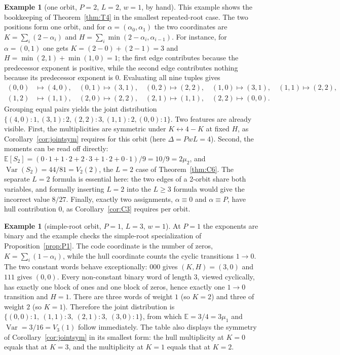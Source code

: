 \documentclass[11pt]{article}
\theoremstyle{definition}
\newtheorem{example}[theorem]{Example}
\theoremstyle{remark}
\newcommand{\E}{\mathbb{E}}
\begin{document}
\begin{example}[one orbit, \(P=2\), \(L=2\), \(w=1\), by hand]
\label{ex:E1}
This example shows the bookkeeping of Theorem~\ref{thm:T4} in the
smallest repeated-root case. The two positions form one orbit, and for
\(\alpha = (\alpha_0,\alpha_1)\) the two coordinates are
\(K = \sum_i (2-\alpha_i)\) and
\(H = \sum_i \min(2-\alpha_i, \alpha_{i-1})\). For instance, for
\(\alpha = (0,1)\) one gets \(K = (2-0) + (2-1) = 3\) and
\(H = \min(2,1) + \min(1,0) = 1\); the first edge contributes because
the predecessor exponent is positive, while the second edge contributes
nothing because its predecessor exponent is \(0\). Evaluating all nine
tuples gives
\[
\begin{aligned}
(0,0)&\mapsto(4,0),\quad (0,1)\mapsto(3,1),\quad (0,2)\mapsto(2,2),\quad
(1,0)\mapsto(3,1),\quad (1,1)\mapsto(2,2),\\
(1,2)&\mapsto(1,1),\quad (2,0)\mapsto(2,2),\quad (2,1)\mapsto(1,1),\quad (2,2)\mapsto(0,0).
\end{aligned}
\]
Grouping equal pairs yields the joint distribution
\(\{(4,0):1, (3,1):2, (2,2):3, (1,1):2, (0,0):1\}\). Two features are
already visible. First, the multiplicities are symmetric under
\(K \leftrightarrow 4-K\) at fixed \(H\), as
Corollary~\ref{cor:jointsym} requires for this orbit (here
\(\Delta = PwL = 4\)). Second, the moments can be read off directly:
\(\E[S_2] = (0\cdot1 + 1\cdot2 + 2\cdot3 + 1\cdot2 + 0\cdot1)/9 =
10/9 = 2\mu_2\), and
\(\operatorname{Var}(S_2) = 44/81 = V_2(2)\), the \(L=2\) case of
Theorem~\ref{thm:C6}. The separate \(L=2\) formula is essential here:
the two edges of a 2-orbit share both variables, and formally inserting
\(L=2\) into the \(L \ge 3\) formula would give the incorrect value
\(8/27\). Finally, exactly two assignments, \(\alpha \equiv 0\) and
\(\alpha \equiv P\), have hull contribution \(0\), as
Corollary~\ref{cor:C3} requires per orbit.
\end{example}

\begin{example}[simple-root orbit, \(P=1\), \(L=3\), \(w=1\)]\label{ex:E2}
At \(P=1\) the exponents are binary and the example checks the
simple-root specialization of Proposition~\ref{prop:P1}. The code
coordinate is the number of zeros, \(K = \sum_i (1-\alpha_i)\), while
the hull coordinate counts the cyclic transitions \(1 \to 0\). The
two constant words behave exceptionally: \(000\) gives \((K,H) =
(3,0)\) and \(111\) gives \((0,0)\). Every non-constant binary word
of length \(3\), viewed cyclically, has exactly one block of ones and
one block of zeros, hence exactly one \(1 \to 0\) transition and
\(H = 1\). There are three words of weight \(1\) (so \(K=2\)) and
three of weight \(2\) (so \(K=1\)). Therefore the joint distribution
is
\(\{(0,0):1,\ (1,1):3,\ (2,1):3,\ (3,0):1\}\), from which
\(\E = 3/4 = 3\mu_1\) and
\(\operatorname{Var} = 3/16 = V_3(1)\) follow immediately. The table
also displays the symmetry of Corollary~\ref{cor:jointsym} in its
smallest form: the hull multiplicity at \(K=0\) equals that at
\(K=3\), and the multiplicity at \(K=1\) equals that at \(K=2\).
\end{example}
\end{document}
